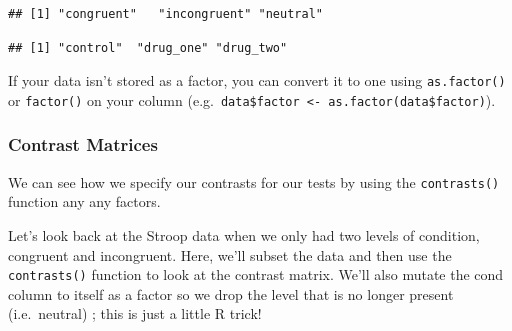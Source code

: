\documentclass[
]{book}
\newenvironment{Shaded}{\begin{snugshade}}{\end{snugshade}}
\newcommand{\AttributeTok}[1]{\textcolor[rgb]{0.77,0.63,0.00}{#1}}
\newcommand{\CommentTok}[1]{\textcolor[rgb]{0.56,0.35,0.01}{\textit{#1}}}
\newcommand{\FunctionTok}[1]{\textcolor[rgb]{0.00,0.00,0.00}{#1}}
\newcommand{\NormalTok}[1]{#1}
\newcommand{\OtherTok}[1]{\textcolor[rgb]{0.56,0.35,0.01}{#1}}
\newcommand{\SpecialCharTok}[1]{\textcolor[rgb]{0.00,0.00,0.00}{#1}}
\newcommand{\StringTok}[1]{\textcolor[rgb]{0.31,0.60,0.02}{#1}}
\begin{document}
\begin{verbatim}
## [1] "congruent"   "incongruent" "neutral"
\end{verbatim}

\begin{Shaded}
\end{Shaded}

\begin{verbatim}
## [1] "control"  "drug_one" "drug_two"
\end{verbatim}

If your data isn't stored as a factor, you can convert it to one using \texttt{as.factor()} or \texttt{factor()} on your column (e.g.~\texttt{data\$factor\ \textless{}-\ as.factor(data\$factor)}).

\hypertarget{contrast-matrices}{%
\subsubsection{Contrast Matrices}\label{contrast-matrices}}

We can see how we specify our contrasts for our tests by using the \texttt{contrasts()} function any any factors.

Let's look back at the Stroop data when we only had two levels of condition, congruent and incongruent. Here, we'll subset the data and then use the \texttt{contrasts()} function to look at the contrast matrix. We'll also mutate the cond column to itself as a factor so we drop the level that is no longer present (i.e.~neutral) ; this is just a little R trick!

\begin{Shaded}
\end{Shaded}
\end{document}
